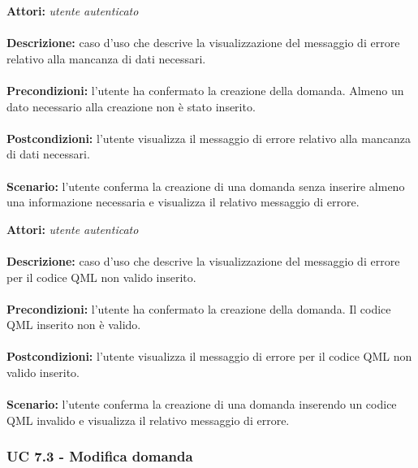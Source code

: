 \documentclass[a4paper,11pt]{article}
\begin{document}
\textbf{Attori:} \textit{utente autenticato}
\\ \\
\textbf{Descrizione:} caso d'uso che descrive la visualizzazione del messaggio di errore relativo alla mancanza di dati necessari.\\
\\
\textbf{Precondizioni:} l'utente ha confermato la creazione della domanda. Almeno un dato necessario alla creazione non è stato inserito.\\
\\
\textbf{Postcondizioni:} l’utente visualizza il messaggio di errore relativo alla mancanza di dati necessari.\\
\\
\textbf{Scenario:} l'utente conferma la creazione di una domanda senza inserire almeno una informazione necessaria e visualizza il relativo messaggio di errore.\\



\textbf{Attori:} \textit{utente autenticato}
\\ \\
\textbf{Descrizione:} caso d'uso che descrive la visualizzazione del messaggio di errore per il codice QML non valido inserito.\\
\\
\textbf{Precondizioni:} l'utente ha confermato la creazione della domanda. Il codice QML inserito non è valido.\\
\\
\textbf{Postcondizioni:} l’utente visualizza il messaggio di errore per il codice QML non valido inserito.\\
\\
\textbf{Scenario:} l'utente conferma la creazione di una domanda inserendo un codice QML invalido e visualizza il relativo messaggio di errore.\\


\newpage
\subsubsection{UC 7.3 - Modifica domanda}
\end{document}
